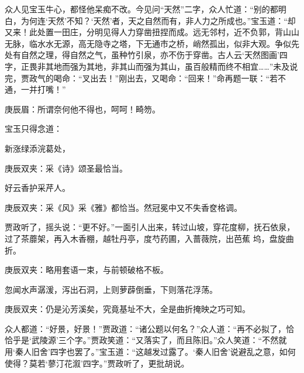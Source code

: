 \begin{parag}
    众人见宝玉牛心，都怪他呆痴不改。今见问“天然”二字，众人忙道：“别的都明白，为何连‘天然’不知？‘天然’者，天之自然而有，非人力之所成也。”宝玉道：“却又来！此处置一田庄，分明见得人力穿凿扭捏而成。远无邻村，近不负郭，背山山无脉，临水水无源，高无隐寺之塔，下无通市之桥，峭然孤出，似非大观。争似先处有自然之理，得自然之气，虽种竹引泉，亦不伤于穿凿。古人云‘天然图画’四字，正畏非其地而强为其地，非其山而强为其山，虽百般精而终不相宜……”未及说完，贾政气的喝命：“叉出去！”刚出去，又喝命：“回来！”命再题一联：“若不通，一并打嘴！”\begin{note}庚辰眉：所谓奈何他不得也，呵呵！畸笏。\end{note}宝玉只得念道：
\end{parag}


\begin{poem}
    \begin{pl} 新涨绿添浣葛处，\end{pl}
    \begin{note}庚辰双夹：采《诗》颂圣最恰当。\end{note}

    \begin{pl} 好云香护采芹人。\end{pl}
    \begin{note}庚辰双夹：采《风》采《雅》都恰当。然冠冕中又不失香奁格调。\end{note}
\end{poem}


\begin{parag}
    贾政听了，摇头说：“更不好。”一面引人出来，转过山坡，穿花度柳，抚石依泉，过了茶蘼架，再入木香棚，越牡丹亭，度芍药圃，入蔷薇院，出芭蕉 坞，盘旋曲折。\begin{note}庚辰双夹：略用套语一束，与前顿破格不板。\end{note}忽闻水声潺湲，泻出石洞，上则萝薜倒垂，下则落花浮荡。\begin{note}庚辰双夹：仍是沁芳溪矣，究竟基址不大，全是曲折掩映之巧可知。\end{note}众人都道：“好景，好景！”贾政道：“诸公题以何名？”众人道：“再不必拟了，恰恰乎是‘武陵源’三个字。”贾政笑道：“又落实了，而且陈旧。”众人笑道：“不然就用‘秦人旧舍’四字也罢了。”宝玉道：“这越发过露了。‘秦人旧舍’说避乱之意，如何使得？莫若‘蓼汀花溆’四字。”贾政听了，更批胡说。
\end{parag}



